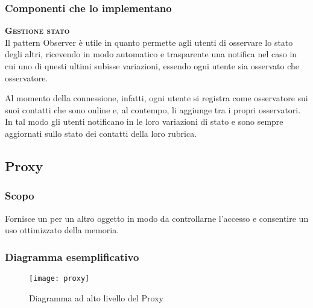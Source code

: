 \subsubsection{Componenti che lo implementano}
\begin{description}
  \item{\scshape\bfseries Gestione stato}\\
Il pattern Observer è utile in quanto permette agli utenti di osservare lo stato degli altri, ricevendo in modo automatico e trasparente una notifica nel caso in cui uno di questi ultimi subisse variazioni, essendo ogni utente sia osservato che osservatore.

Al momento della connessione, infatti, ogni utente si registra come osservatore sui suoi contatti che sono online e, al contempo, li aggiunge tra i propri osservatori. In tal modo gli utenti notificano in  le loro variazioni di stato e sono sempre aggiornati sullo stato dei contatti della loro rubrica.
\end{description}

\subsection{Proxy}

\subsubsection{Scopo}
Fornisce un  per un altro oggetto in modo da controllarne l'accesso e consentire un uso ottimizzato della memoria.

\subsubsection{Diagramma esemplificativo}
\begin{figure}[H]
\centering
\texttt{[image: proxy]}
\caption{Diagramma ad alto livello del  Proxy}\label{fig:proxy}
\end{figure}

